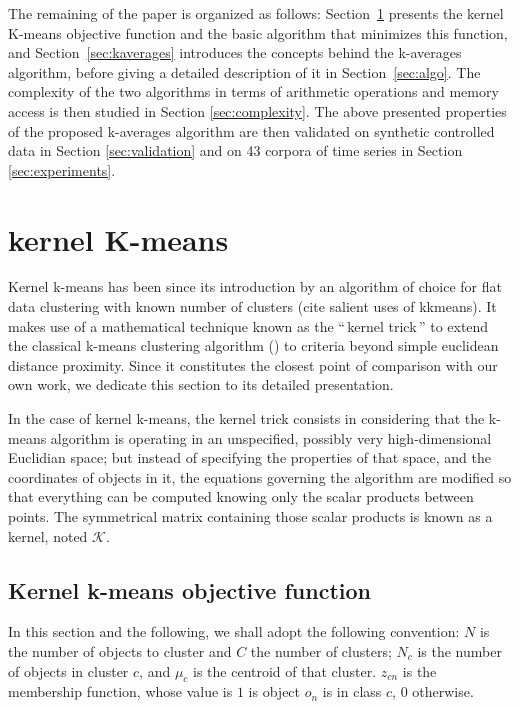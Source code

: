 \documentclass[a4paper,twoside]{article}
\newcommand{\gl}[1]{``\,#1\,''} %
\begin{document}
The remaining of the paper is organized as follows: Section~\ref{sec:kkmeans} presents the kernel K-means objective function and the basic algorithm that minimizes this function, and Section~\ref{sec:kaverages} introduces the concepts behind the k-averages algorithm, before giving a detailed description of it in Section~\ref{sec:algo}. The complexity of the two algorithms in terms of arithmetic operations and memory access is then studied in Section \ref{sec:complexity}. The above presented properties of the proposed k-averages algorithm are then validated on synthetic controlled data in Section \ref{sec:validation} and on 43 corpora of time series in Section \ref{sec:experiments}.

\section{kernel K-means} \label{sec:kkmeans}

Kernel k-means has been since its introduction by \cite{Girolami:2002:MKC:2325785.2326903} an algorithm of choice for flat data clustering with known number of clusters (cite salient uses of kkmeans). It makes use of a mathematical technique known as the \gl{kernel trick} to extend the classical k-means clustering algorithm (\cite{macQueenBsmsp67}) to criteria beyond simple euclidean distance proximity. Since it constitutes the closest point of comparison with our own work, we dedicate this section to its detailed presentation.

In the case of kernel k-means, the kernel trick consists in considering that the k-means algorithm is operating in an unspecified, possibly very high-dimensional Euclidian space; but instead of specifying the properties of that space, and the coordinates of objects in it, the equations governing the algorithm are modified so that everything can be computed knowing only the scalar products between points. The symmetrical matrix  containing those scalar products is known as a kernel, noted $\mathcal{K}$.

\subsection{Kernel k-means objective function}

In this section and the following, we shall adopt the following convention: $N$ is the number of objects to cluster and $C$ the number of clusters; $N_c$ is the number of objects in cluster $c$, and $\mu_c$ is the centroid of that cluster. $z_{cn}$ is the membership function, whose value is $1$ is object $o_n$ is in class $c$, $0$ otherwise.
\end{document}
